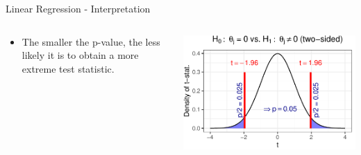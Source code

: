 \documentclass[11pt,compress,t,notes=noshow, aspectratio=169, xcolor=table]{beamer}
\begin{document}
\begin{frame}{Linear Regression - Interpretation}
{\begin{columns}[T, totalwidth=\linewidth]
\begin{column}{0.6\textwidth}
\begin{itemize}
        \item The smaller the p-value, the less likely it is to obtain a more extreme test statistic.
    \end{itemize}
    \end{column}
    \begin{column}{0.4\textwidth}
    \vspace{-0.3cm}
    \begin{center}
        \includegraphics[width=.9\textwidth]{figure/p-value.pdf}
    \end{center}
    \end{column}
    \end{columns}}
\end{frame}
\end{document}
